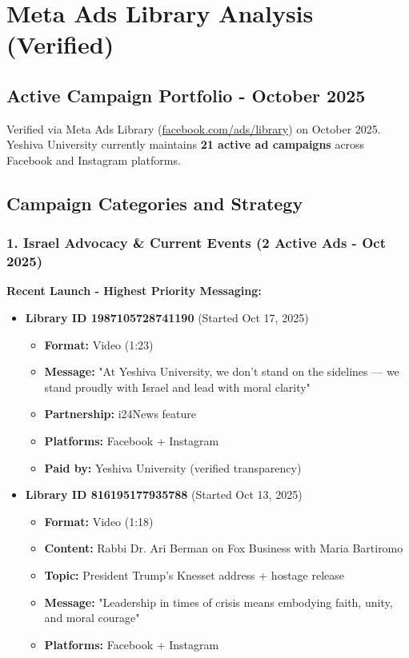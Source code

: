 \documentclass[12pt,letterpaper]{article}
\begin{document}
\section{Meta Ads Library Analysis (Verified)}

\subsection{Active Campaign Portfolio - October 2025}

Verified via Meta Ads Library (\url{facebook.com/ads/library}) on October 2025. Yeshiva University currently maintains \textbf{21 active ad campaigns} across Facebook and Instagram platforms.

\subsection{Campaign Categories and Strategy}

\subsubsection{1. Israel Advocacy \& Current Events (2 Active Ads - Oct 2025)}

\textbf{Recent Launch - Highest Priority Messaging:}
\begin{itemize}[leftmargin=*]
    \item \textbf{Library ID 1987105728741190} (Started Oct 17, 2025)
    \begin{itemize}
        \item \textbf{Format:} Video (1:23)
        \item \textbf{Message:} "At Yeshiva University, we don't stand on the sidelines — we stand proudly with Israel and lead with moral clarity"
        \item \textbf{Partnership:} i24News feature
        \item \textbf{Platforms:} Facebook + Instagram
        \item \textbf{Paid by:} Yeshiva University (verified transparency)
    \end{itemize}

    \item \textbf{Library ID 816195177935788} (Started Oct 13, 2025)
    \begin{itemize}
        \item \textbf{Format:} Video (1:18)
        \item \textbf{Content:} Rabbi Dr. Ari Berman on Fox Business with Maria Bartiromo
        \item \textbf{Topic:} President Trump's Knesset address + hostage release
        \item \textbf{Message:} "Leadership in times of crisis means embodying faith, unity, and moral courage"
        \item \textbf{Platforms:} Facebook + Instagram
    \end{itemize}
\end{itemize}
\end{document}
